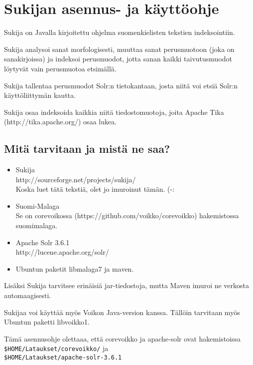 \documentclass[12pt,a4paper]{scrartcl}
\begin{document}
\pagestyle{fancy}
\setlength{\parindent}{0pt}
\setlength{\parskip}{1ex plus 0.5ex minus 0.2ex}
\section*{Sukijan asennus- ja käyttöohje}

Sukija on Javalla kirjoitettu ohjelma suomenkielisten tekstien
indeksointiin.

Sukija analysoi sanat morfologisesti, muuttaa sanat perusmuotoon (joka
on sanakirjoissa) ja indeksoi perusmuodot, jotta sanan kaikki
taivutusmuodot löytyvät vain perusmuotoa etsimällä.

Sukija tallentaa perusmuodot Solr:n tietokantaan, josta niitä voi
etsiä Solr:n käyttöliittymän kautta.

Sukija osaa indeksoida kaikkia niitä tiedostomuotoja, joita Apache
Tika \\(http://tika.apache.org/) osaa lukea.

\subsection*{Mitä tarvitaan ja mistä ne saa?}

\begin{itemize}

\item Sukija \\
      http://sourceforge.net/projects/sukija/ \\
      Koska luet tätä tekstiä, olet jo imuroinut tämän. (-:

\item Suomi-Malaga \\
      Se on corevoikossa (https://github.com/voikko/corevoikko)
      hakemistossa \\
      suomimalaga.

\item Apache Solr 3.6.1 \\
      http://lucene.apache.org/solr/

\item Ubuntun paketit libmalaga7 ja maven.
\end{itemize}

Lisäksi Sukija tarvitsee erinäisiä jar-tiedostoja, mutta Maven imuroi
ne verkosta automaagisesti.

Sukijaa voi käyttää myös Voikon Java-version kanssa. Tällöin tarvitaan
myös Ubuntun paketti libvoikko1.

Tämä asennusohje olettaaa, että corevoikko ja apache-solr ovat hakemistoissa \\
\verb=$HOME/Lataukset/corevoikko/= ja \\
\verb=$HOME/Lataukset/apache-solr-3.6.1=
\end{document}
